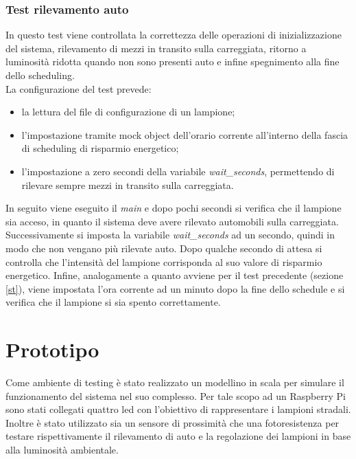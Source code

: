 \subsubsection{Test rilevamento auto}
In questo test viene controllata la correttezza delle operazioni di inizializzazione del sistema, rilevamento di mezzi in transito sulla carreggiata, ritorno a luminosità ridotta quando non sono presenti auto e infine spegnimento alla fine dello scheduling.
\\La configurazione del test prevede:
\begin{itemize}
	\item la lettura del file di configurazione di un lampione;
	\item l'impostazione tramite mock object dell'orario corrente all'interno della fascia di scheduling di risparmio energetico;
	\item l'impostazione a zero secondi della variabile \textit{wait\_seconds}, permettendo di rilevare sempre mezzi in transito sulla carreggiata.
\end{itemize}
In seguito viene eseguito il \textit{main} e dopo pochi secondi si verifica che il lampione sia acceso, in quanto il sistema deve avere rilevato automobili sulla carreggiata.
Successivamente si imposta la variabile \textit{wait\_seconds} ad un secondo, quindi in modo che non vengano più rilevate auto.
Dopo qualche secondo di attesa si controlla che l'intensità del lampione corrisponda al suo valore di risparmio energetico.
Infine, analogamente a quanto avviene per il test precedente (sezione \ref{st}), viene impostata l'ora corrente ad un minuto dopo la fine dello schedule e si verifica che il lampione si sia spento correttamente.


\section{Prototipo}
Come ambiente di testing è stato realizzato un modellino in scala per simulare il funzionamento del sistema nel suo complesso.
Per tale scopo ad un Raspberry Pi sono stati collegati quattro led con l'obiettivo di rappresentare i lampioni stradali.
Inoltre è stato utilizzato sia un sensore di prossimità che una fotoresistenza per testare rispettivamente il rilevamento di auto e la regolazione dei lampioni in base alla luminosità ambientale.
